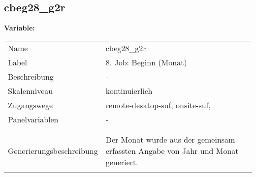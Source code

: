 	
	
	\subsection{cbeg28\_g2r}
	\label{subSection:cbeg28_g2r}

	\noindent\textbf{Variable:}\\
		\begin{tabular}{lL{11.3cm}}
			\label{tableVariable:cbeg28_g2r}
			Name & cbeg28\_g2r \\
			Label & 8. Job: Beginn (Monat) \\
			Beschreibung & - \\
			Skalenniveau & kontinuierlich \\
			Zugangswege &
				remote-desktop-suf,
				onsite-suf,
 \\
			Panelvariablen & -
			 \\
			 \\
 \\
					Generierungsbeschreibung & Der Monat wurde aus der gemeinsam erfassten Angabe von Jahr und Monat generiert. 
				 \\	
			 \\
		\end{tabular}





